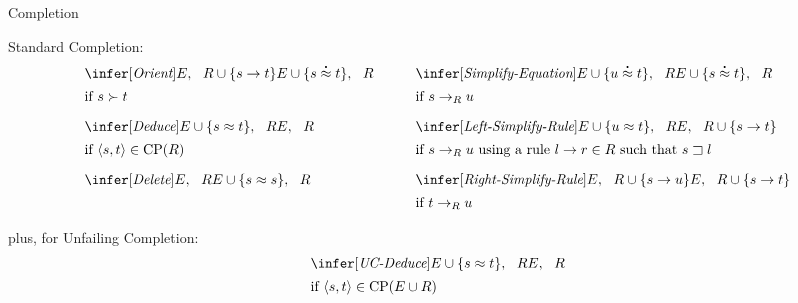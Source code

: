 \begin{entry}{Completion}

\newcommand{\deq}{\buildrel{\mbox{\Large.}}\over\approx}

\begin{calculus}


Standard Completion:
\[
\begin{array}{l@{\qquad}l}
\begin{array}{ll}
\infer[\textit{Orient}]
  {\strut E, \ \  R \cup \{ s \to t \}}
  {E \cup \{ s \deq t \}, \ \  R} \\
\mbox{if $s \succ t$\rule[-3ex]{0ex}{6ex}}
\end{array}
&
\begin{array}{ll}
\infer[\textit{Simplify-Equation}]
  {\strut E \cup \{ u \deq t \}, \ \  R}
  {E \cup \smash{\{ s \deq t \}}, \ \  R} \\
\mbox{if $s \to_R u$\rule[-3ex]{0ex}{6ex}}
\end{array}
\\
\begin{array}{ll}
\infer[\textit{Deduce}]
  {\strut E \cup \{ s \approx t \}, \ \  R}
  {E, \ \  R} \\
\mbox{if $\langle s,t \rangle \in \mathrm{CP}(R)$\rule[-3ex]{0ex}{6ex}}
\end{array}
&
\begin{array}{ll}
\infer[\textit{Left-Simplify-Rule}]
  {\strut E \cup \{ u \approx t \}, \ \  R}
  {E, \ \  R \cup \{ s \to t \}} \\
\mbox{if $s \to_R u$ using a rule $l \to r \in R$ such that $s \sqsupset l$\rule[-3ex]{0ex}{6ex}}
\end{array}
\\
\begin{array}{ll}
\infer[\textit{Delete}]
  {\strut E, \ \  R}
  {E \cup \{ s \approx s \}, \ \  R} \\
\mbox{\rule[-3ex]{0ex}{4ex}}
\end{array}
&
\begin{array}{ll}
\infer[\textit{Right-Simplify-Rule}]
  {\strut E, \ \  R \cup \{ s \to u \}}
  {E, \ \  R \cup \{ s \to t \}} \\
\mbox{if $t \to_R u$\rule[-2ex]{0ex}{5ex}}
\end{array}
\end{array}
\]
plus, for Unfailing Completion:
\[
\begin{array}{ll}
\infer[\textit{UC-Deduce}]
  {\strut E \cup \{ s \approx t \}, \ \  R}
  {E, \ \  R} \\
\mbox{if $\langle s,t \rangle \in \mathrm{CP}(E \cup R)$\rule[-3ex]{0ex}{6ex}}
\end{array}
\]


\end{calculus}
\end{entry}
